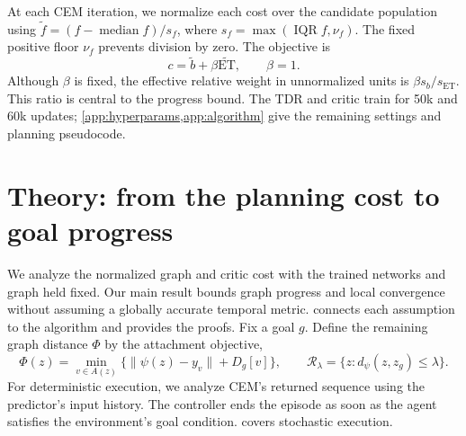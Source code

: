 \documentclass{article}
\newcommand{\ET}{\mathrm{ET}}
\newcommand{\dd}{d_{\psi}}
\newcommand{\Rset}{\mathcal R_\lambda}
\theoremstyle{definition}
\theoremstyle{remark}
\begin{document}
At each CEM iteration, we normalize each cost over the candidate population using
$\widetilde f=(f-\operatorname{median}f)/s_f$, where
$s_f=\max(\operatorname{IQR}f,\nu_f)$. The fixed positive floor $\nu_f$ prevents division by zero.
The objective is
\begin{equation}
 c=\widetilde b+\beta\widetilde{\ET},\qquad \beta=1.
 \label{eq:compose}
\end{equation}
Although $\beta$ is fixed, the effective relative weight in unnormalized units is
$\beta s_b/s_{\ET}$. This ratio is central to the progress bound.
The TDR and critic train for 50k and 60k updates; \cref{app:hyperparams,app:algorithm}
give the remaining settings and planning pseudocode.

\section{Theory: from the planning cost to goal progress}
\label{sec:theory}
We analyze the normalized graph and critic cost with the trained networks and graph
held fixed. Our main result bounds graph progress and local convergence without
assuming a globally accurate temporal metric.  connects each assumption
to the algorithm and provides the proofs.
Fix a goal $g$. Define the remaining graph distance $\Phi$ by the attachment objective,
\begin{equation}
 \Phi(z)=\min_{v\in A(z)}\{\|\psi(z)-y_v\|+D_g[v]\},
 \qquad \Rset=\{z:\dd(z,z_g)\le\lambda\}.
 \label{eq:potential}
\end{equation}
For deterministic execution, we analyze CEM's returned sequence using the predictor's input history.
The controller ends the episode as soon as the agent satisfies the environment's goal condition.
 covers stochastic execution.
\end{document}
